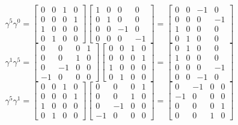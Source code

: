 \documentclass{styles/kaobook}
\begin{document}
$$
\gamma^{5} \gamma^{0}=\begin{bmatrix}
0 & 0 & 1 & 0 \\
0 & 0 & 0 & 1 \\
1 & 0 & 0 & 0 \\
0 & 1 & 0 & 0
\end{bmatrix}\begin{bmatrix}
1 & 0 & 0 & 0 \\
0 & 1 & 0 & 0 \\
0 & 0 & -1 & 0 \\
0 & 0 & 0 & -1
\end{bmatrix}=\begin{bmatrix}
0 & 0 & -1 & 0 \\
0 & 0 & 0 & -1 \\
1 & 0 & 0 & 0 \\
0 & 1 & 0 & 0
\end{bmatrix}
$$
$$
\gamma^{1} \gamma^{5}=\begin{bmatrix}
0 & 0 & 0 & 1 \\
0 & 0 & 1 & 0 \\
0 & -1 & 0 & 0 \\
-1 & 0 & 0 & 0
\end{bmatrix}\begin{bmatrix}
0 & 0 & 1 & 0 \\
0 & 0 & 0 & 1 \\
1 & 0 & 0 & 0 \\
0 & 1 & 0 & 0
\end{bmatrix}=\begin{bmatrix}
0 & 1 & 0 & 0 \\
1 & 0 & 0 & 0 \\
0 & 0 & 0 & -1 \\
0 & 0 & -1 & 0
\end{bmatrix}
$$
$$
\gamma^{5} \gamma^{1}=\begin{bmatrix}
0 & 0 & 1 & 0 \\
0 & 0 & 0 & 1 \\
1 & 0 & 0 & 0 \\
0 & 1 & 0 & 0
\end{bmatrix}\begin{bmatrix}
0 & 0 & 0 & 1 \\
0 & 0 & 1 & 0 \\
0 & -1 & 0 & 0 \\
-1 & 0 & 0 & 0
\end{bmatrix}=\begin{bmatrix}
0 & -1 & 0 & 0 \\
-1 & 0 & 0 & 0 \\
0 & 0 & 0 & 1 \\
0 & 0 & 1 & 0
\end{bmatrix}
$$
\end{document}
